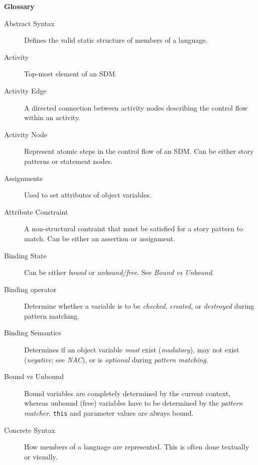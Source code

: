 \newpage
{}
{}
\hypertarget{glossary}{}
\genHeader

\vspace{1cm}
{\Huge \bf Glossary}
\vspace{1cm}


\begin{description}

\item[Abstract Syntax] 
Defines the valid static structure of members of a language. 

\item[Activity]
Top-most element of an SDM.

\item[Activity Edge]
A directed connection between activity nodes describing the control flow within an activity.

\item[Activity Node]
Represent atomic steps in the control flow of an SDM. Can be either story patterns or statement nodes.

\item[Assignments]
Used to set attributes of object variables.

\item[Attribute Constraint]
A non-structural contraint that must be satisfied for a story pattern to match. Can be either an assertion or assignment.

\item[Binding State]
Can be either \emph{bound} or \emph{unbound/free}. See \emph{Bound vs Unbound}.

\item[Binding operator]
Determine whether a variable is to be \emph{checked}, \emph{created}, or \emph{destroyed} during pattern matching.

\item[Binding Semantics]
Determines if an object variable \emph{must} exist (\emph{madatory}), may not exist (\emph{negative}; see \emph{NAC}), or is \emph{optional} during
\emph{pattern matching}.

\item[Bound vs Unbound]
Bound variables are completely determined by the current context, whereas unbound (free) variables have to be determined by the \emph{pattern matcher}.
\texttt{this} and parameter values are always bound.

\item[Concrete Syntax]
How members of a language are represented. This is often done textually or visually.


\end{description}
